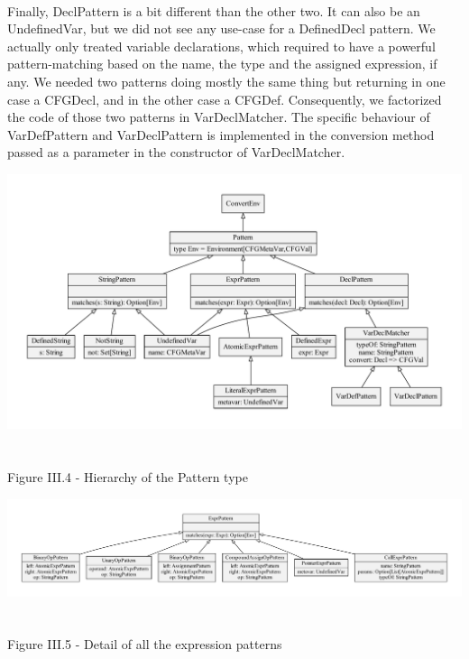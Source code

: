 \documentclass{report}
\begin{document}
\paragraph{}
\hspace{4mm}Finally, DeclPattern is a bit different than the other two. It can also be an UndefinedVar, but we did not see any use-case for a DefinedDecl pattern. 
We actually only treated variable declarations, which required to have a powerful pattern-matching based on the name, the type and the assigned expression, if any.
We needed two patterns doing mostly the same thing but returning in one case a CFGDecl, and in the other case a CFGDef. Consequently, we factorized the code of those two patterns
in VarDeclMatcher. The specific behaviour of VarDefPattern and VarDeclPattern is implemented in the conversion method passed as a parameter in the constructor of VarDeclMatcher.

\begin{center}
\includegraphics[scale=0.55]{data/patterns}
~\\~\\Figure III.4 - Hierarchy of the Pattern type
\end{center}

\begin{center}
\includegraphics[scale=0.45]{data/expr_pattern}
~\\~\\Figure III.5 - Detail of all the expression patterns
\end{center}
\end{document}
